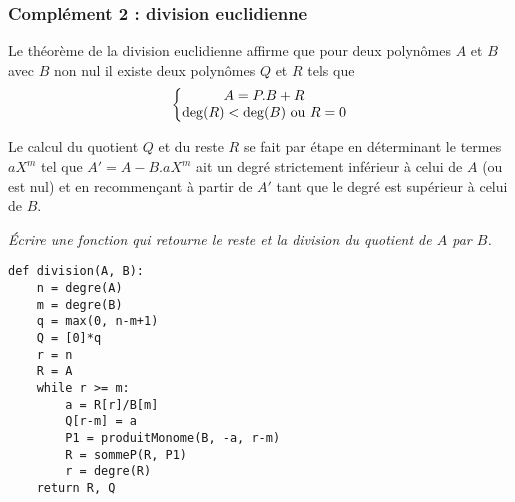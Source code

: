 \subsubsection{Complément 2 : division euclidienne}
Le théorème de la division euclidienne affirme que pour deux polynômes $A$ et $B$ avec $B$ non nul il existe deux polynômes $Q$ et $R$ tels que 
\[\left\{\begin{matrix} A = P.B +R\\ \deg(R) < \deg(B)\hbox{ ou } R = 0\end{matrix}\right.\]

Le calcul du quotient $Q$ et du reste $R$ se fait par étape en déterminant le termes $aX^m$ tel que $A' = A-B.aX^m$ ait un degré strictement inférieur à celui de $A$ (ou est nul) et en recommençant à partir de $A'$ tant que le degré est supérieur à celui de $B$.
\begin{Exercise}\it Écrire une fonction  qui retourne le reste et la division du quotient de $A$ par $B$.
\end{Exercise}
\begin{Answer}
\begin{lstlisting}
def division(A, B):
    n = degre(A)
    m = degre(B)
    q = max(0, n-m+1)
    Q = [0]*q
    r = n
    R = A
    while r >= m:
        a = R[r]/B[m]
        Q[r-m] = a
        P1 = produitMonome(B, -a, r-m)
        R = sommeP(R, P1)
        r = degre(R)
    return R, Q
\end{lstlisting}
\end{Answer}









